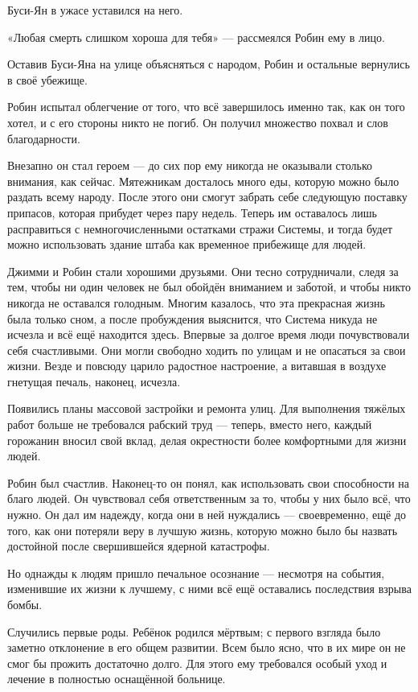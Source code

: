\documentclass[a5paper, 9pt,
final, openany, twoside=true]{memoir}
\begin{document}
Буси-Ян в ужасе уставился на него.

«Любая смерть слишком хороша для тебя» — рассмеялся Робин ему в лицо.

Оставив Буси-Яна на улице объясняться с народом, Робин и остальные вернулись в своё убежище.

Робин испытал облегчение от того, что всё завершилось именно так, как он того хотел, и с его стороны никто не погиб. Он получил множество похвал и слов благодарности.

Внезапно он стал героем — до сих пор ему никогда не оказывали столько внимания, как сейчас. Мятежникам досталось много еды, которую можно было раздать всему народу. После этого они смогут забрать себе следующую поставку припасов, которая прибудет через пару недель. Теперь им оставалось лишь расправиться с немногочисленными остатками стражи Системы, и тогда будет можно использовать здание штаба как временное прибежище для людей.\bigskip

Джимми и Робин стали хорошими друзьями. Они тесно сотрудничали, следя за тем, чтобы ни один человек не был обойдён вниманием и заботой, и чтобы никто никогда не оставался голодным. Многим казалось, что эта прекрасная жизнь была только сном, а после пробуждения выяснится, что Система никуда не исчезла и всё ещё находится здесь. Впервые за долгое время люди почувствовали себя счастливыми. Они могли свободно ходить по улицам и не опасаться за свои жизни. Везде и повсюду царило радостное настроение, а витавшая в воздухе гнетущая печаль, наконец, исчезла.

Появились планы массовой застройки и ремонта улиц. Для выполнения тяжёлых работ больше не требовался рабский труд — теперь, вместо него, каждый горожанин вносил свой вклад, делая окрестности более комфортными для жизни людей.\bigskip

Робин был счастлив. Наконец-то он понял, как использовать свои способности на благо людей. Он чувствовал себя ответственным за то, чтобы у них было всё, что нужно. Он дал им надежду, когда они в ней нуждались — своевременно, ещё до того, как они потеряли веру в лучшую жизнь, которую можно было бы назвать достойной после свершившейся ядерной катастрофы.\bigskip

Но однажды к людям пришло печальное осознание — несмотря на события, изменившие их жизни к лучшему, с ними всё ещё оставались последствия взрыва бомбы.

Случились первые роды. Ребёнок родился мёртвым; с первого взгляда было заметно отклонение в его общем развитии. Всем было ясно, что в их мире он не смог бы прожить достаточно долго. Для этого ему требовался особый уход и лечение в полностью оснащённой больнице.
\end{document}
